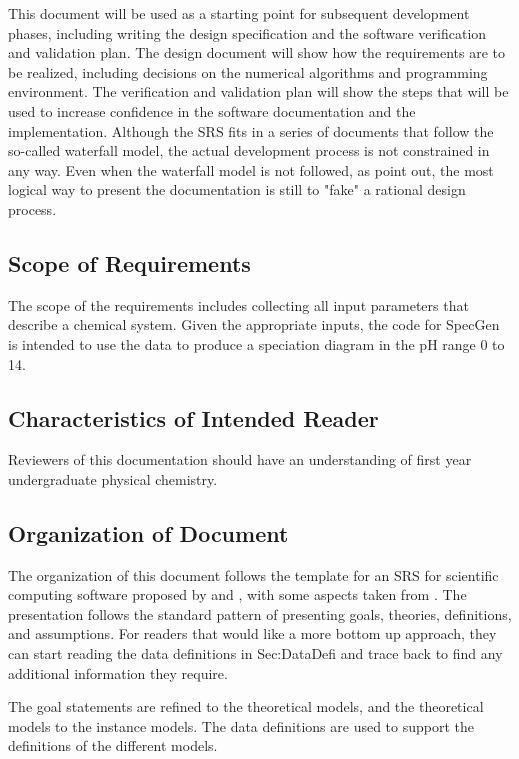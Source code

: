 \documentclass[12pt]{article}
\begin{document}
This document will be used as a starting point for subsequent development phases, including writing the design specification and the software verification and validation plan. The design document will show how the requirements are to be realized, including decisions on the numerical algorithms and programming environment. The verification and validation plan will show the steps that will be used to increase confidence in the software documentation and the implementation. Although the SRS fits in a series of documents that follow the so-called waterfall model, the actual development process is not constrained in any way. Even when the waterfall model is not followed, as \cite{ParnasAndClements1986} point out, the most logical way to present the documentation is still to "fake" a rational design process.

\subsection{Scope of Requirements} 
The scope of the requirements includes collecting all input parameters that describe a chemical system. Given the appropriate inputs, the code for SpecGen is intended to use the data to produce a speciation diagram in the pH range 0 to 14. 

\subsection{Characteristics of Intended Reader} 
Reviewers of this documentation should have an understanding of first year undergraduate physical chemistry.


\subsection{Organization of Document}
The organization of this document follows the template for an SRS for scientific computing software proposed by \cite{SmithAndLai2005} and \cite{Koothoor2013}, with some aspects taken from \cite{RobertsonAndRobertson1999Vol}. The presentation follows the standard pattern of presenting goals, theories, definitions, and assumptions. For readers that would like a more bottom up approach, they can start reading the data definitions in Sec:DataDefi and trace back to find any additional information they require.

The goal statements are refined to the theoretical models, and the theoretical models to the instance models. The data definitions are used to support the definitions of the different models.
\end{document}
